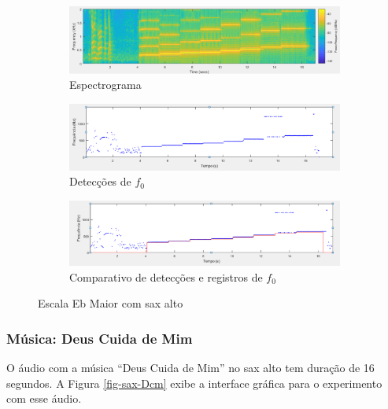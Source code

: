 \begin{figure}
	
	\begin{subfigure}{1\textwidth}
		\includegraphics[width=\linewidth]{pasta1_figuras/sax-escala-2.png}
		\caption{Espectrograma}
		\label{fig-sax-escala-2}
	\end{subfigure}
	
	\begin{subfigure}{1\textwidth}
		\includegraphics[width=\linewidth]{pasta1_figuras/sax-escala-3.png}
		\caption{Detecções de $f_0$}
		\label{fig-sax-escala-3}
	\end{subfigure}
	
	\begin{subfigure}{1\textwidth}
		\includegraphics[width=\linewidth]{pasta1_figuras/sax-escala-4.png}
		\caption{Comparativo de detecções e registros de $f_0$}
		\label{fig-sax-escala-4}
	\end{subfigure}
	\caption{Escala Eb Maior com sax alto}
\end{figure}

\subsubsection{Música: Deus Cuida de Mim}

O áudio com a música ``Deus Cuida de Mim'' no sax alto tem duração de 16 segundos. A Figura \ref{fig-sax-Dcm} exibe a interface gráfica para o experimento com esse áudio.

